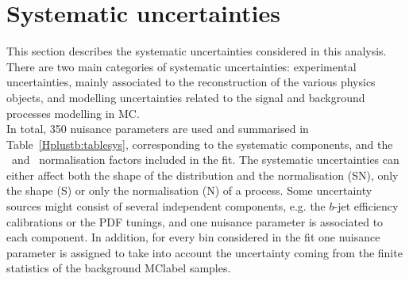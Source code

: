 \section{Systematic uncertainties}
This section describes the systematic uncertainties considered in this analysis. There are two main categories of systematic uncertainties: experimental uncertainties, mainly associated to the reconstruction of the various physics objects, and modelling uncertainties related to the signal and background processes modelling in MC.\\

In total, 350 nuisance parameters are used and summarised in Table~\ref{Hplustb:tablesys}, corresponding to the systematic components, and the \ttb\ and \ttc\ normalisation factors included in the fit. The systematic uncertainties can either affect both the shape of the distribution and the normalisation (SN), only the shape (S) or only the normalisation (N) of a process. Some uncertainty sources might consist of several independent components, e.g. the $b$-jet efficiency calibrations or the PDF tunings, and one nuisance parameter is associated to each component. In addition, for every bin considered in the fit one nuisance parameter is assigned to take into account the uncertainty coming from the finite statistics of the background \acrshort{MClabel} samples.

